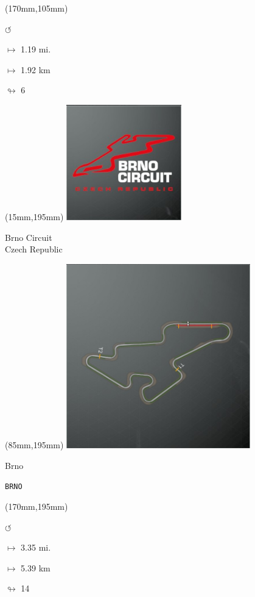 \begin{textblock*}{30mm}(170mm,105mm)%
\par \Huge$\circlearrowleft$
\Large
\par$\mapsto$ 1.19 mi.
\par$\mapsto$ 1.92 km
\par$\looparrowright$ 6
\end{textblock*}
\begin{textblock*}{60mm}(15mm,195mm)%
\includegraphics[width=50mm]{LG/2015-05-20_00075.png}
\par Brno Circuit\\ Czech Republic
\end{textblock*}
\begin{textblock*}{80mm}(85mm,195mm)%
\includegraphics[width=80mm]{TR/2015-05-20_00009.png}
\centerline{Brno}
\par\hfill\tiny\tt BRNO\\
\end{textblock*}
\begin{textblock*}{30mm}(170mm,195mm)%
\par \Huge$\circlearrowleft$
\Large
\par$\mapsto$ 3.35 mi.
\par$\mapsto$ 5.39 km
\par$\looparrowright$ 14
\end{textblock*}
\null\newpage

